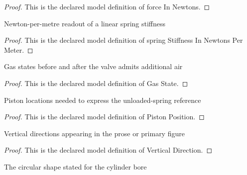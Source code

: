 \begin{proof}
  This is the declared model definition of force In Newtons.
\end{proof}
\begin{definition}
  \label{def:physics:phyx-mini-0396:phyxminiproblems-problemphyxmini0396-springstiffnessinnewtonspermeter}
  Newton-per-metre readout of a linear spring stiffness
\end{definition}
\begin{proof}
  This is the declared model definition of spring Stiffness In Newtons Per Meter.
\end{proof}
\begin{definition}
  \label{def:physics:phyx-mini-0396:phyxminiproblems-problemphyxmini0396-gasstate}
  Gas states before and after the valve admits additional air
\end{definition}
\begin{proof}
  This is the declared model definition of Gas State.
\end{proof}
\begin{definition}
  \label{def:physics:phyx-mini-0396:phyxminiproblems-problemphyxmini0396-pistonposition}
  Piston locations needed to express the unloaded-spring reference
\end{definition}
\begin{proof}
  This is the declared model definition of Piston Position.
\end{proof}
\begin{definition}
  \label{def:physics:phyx-mini-0396:phyxminiproblems-problemphyxmini0396-verticaldirection}
  Vertical directions appearing in the prose or primary figure
\end{definition}
\begin{proof}
  This is the declared model definition of Vertical Direction.
\end{proof}
\begin{definition}
  \label{def:physics:phyx-mini-0396:phyxminiproblems-problemphyxmini0396-cylindercrosssection}
  The circular shape stated for the cylinder bore
\end{definition}
